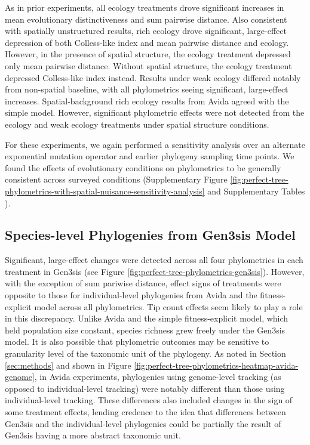 As in prior experiments, all ecology treatments drove significant increases in mean evolutionary distinctiveness and sum pairwise distance.
Also consistent with spatially unstructured results, rich ecology drove significant, large-effect depression of both Colless-like index and mean pairwise distance and ecology.
However, in the presence of spatial structure, the ecology treatment depressed only mean pairwise distance.
Without spatial structure, the ecology treatment depressed Colless-like index instead.
Results under weak ecology differed notably from non-spatial baseline, with all phylometrics seeing significant, large-effect increases.
Spatial-background rich ecology results from Avida agreed with the simple model.
However, significant phylometric effects were not detected from the ecology and weak ecology treatments under spatial structure conditions.

For these experiments, we again performed a sensitivity analysis over an alternate exponential mutation operator and earlier phylogeny sampling time points.
We found the effects of evolutionary conditions on phylometrics to be generally consistent across surveyed conditions (Supplementary Figure \ref{fig:perfect-tree-phylometrics-with-spatial-nuisance-sensitivity-analysis} and Supplementary Tables ).

\subsection{Species-level Phylogenies from Gen3sis Model}




Significant, large-effect changes were detected across all four phylometrics in each treatment in Gen3sis (see Figure \ref{fig:perfect-tree-phylometrics-gen3sis}).
However, with the exception of sum pariwise distance, effect signs of treatments were opposite to those for individual-level phylogenies from Avida and the fitness-explicit model across all phylometrics.
Tip count effects seem likely to play a role in this discrepancy.
Unlike Avida and the simple fitness-explicit model, which held population size constant, species richness grew freely under the Gen3sis model.
It is also possible that phylometric outcomes may be sensitive to granularity level of the taxonomic unit of the phylogeny.
As noted in Section \ref{sec:methods} and shown in Figure \ref{fig:perfect-tree-phylometrics-heatmap-avida-genome}, in Avida experiments, phylogenies using genome-level tracking (as opposed to individual-level tracking) were notably different than those using individual-level tracking.
These differences also included changes in the sign of some treatment effects, lending credence to the idea that differences between Gen3sis and the individual-level phylogenies could be partially the result of Gen3sis having a more abstract taxonomic unit.

